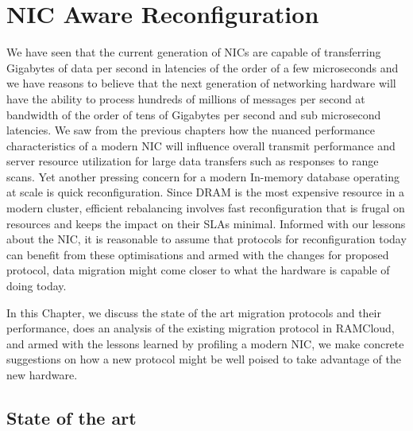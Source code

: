 
\chapter{NIC Aware Reconfiguration}
\label{chap:migration}
We have seen that the current generation of NICs are capable of transferring Gigabytes of 
data per second in latencies of the order of a few microseconds and we have reasons to believe 
that the next generation of networking hardware will have the ability to process 
hundreds of millions of messages per second at bandwidth of the order of tens of Gigabytes per 
second and sub microsecond latencies\cite{cx6}.
We saw from the previous chapters how the nuanced performance characteristics of 
a modern NIC will influence overall transmit performance and server resource utilization 
for large data transfers such as responses to range scans. Yet another pressing 
concern for a modern In-memory database operating at scale is quick reconfiguration. 
Since DRAM is the most expensive resource in a modern cluster, efficient rebalancing 
involves fast reconfiguration that is frugal on resources and keeps the impact on their 
SLAs minimal. Informed with our lessons about the NIC, it is reasonable to assume that protocols for reconfiguration 
today can benefit from these optimisations and armed with the changes for proposed protocol, data migration might come 
closer to what the hardware is capable of doing today.

In this Chapter, we discuss the state of the art migration protocols and their 
performance, does an analysis of the existing migration protocol in RAMCloud, 
and armed with the lessons learned by profiling a modern NIC, we make concrete 
suggestions on how a new protocol might be well poised to take advantage of the 
new hardware.
\section{State of the art}


